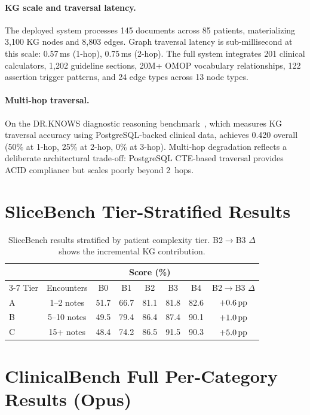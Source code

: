 \paragraph{KG scale and traversal latency.}
The deployed system processes 145 documents across 85 patients, materializing 3{,}100 KG nodes and 8{,}803 edges.
Graph traversal latency is sub-millisecond at this scale: 0.57\,ms (1-hop), 0.75\,ms (2-hop).
The full system integrates 201 clinical calculators, 1{,}202 guideline sections, 20M+ OMOP vocabulary relationships, 122 assertion trigger patterns, and 24 edge types across 13 node types.

\paragraph{Multi-hop traversal.}
\label{app:drknows}
On the DR.KNOWS diagnostic reasoning benchmark~\cite{drknows2025}, which measures KG traversal accuracy using PostgreSQL-backed clinical data, \epikg achieves 0.420 overall (50\% at 1-hop, 25\% at 2-hop, 0\% at 3-hop).
Multi-hop degradation reflects a deliberate architectural trade-off: PostgreSQL CTE-based traversal provides ACID compliance but scales poorly beyond 2~hops.


\section{SliceBench Tier-Stratified Results}
\label{app:slicebench_tiers}

\begin{table}[ht]
\centering
\small
\caption{SliceBench results stratified by patient complexity tier. B2$\rightarrow$B3 $\Delta$ shows the incremental KG contribution.}
\label{tab:slicebench_tiers}
\begin{tabular}{@{}lccccccc@{}}
\toprule
& & \multicolumn{5}{c}{Score (\%)} & \\
\cmidrule(lr){3-7}
Tier & Encounters & B0 & B1 & B2 & B3 & B4 & B2$\rightarrow$B3 $\Delta$ \\
\midrule
A & 1--2 notes & 51.7 & 66.7 & 81.1 & 81.8 & 82.6 & $+0.6\,\text{pp}$ \\
B & 5--10 notes & 49.5 & 79.4 & 86.4 & 87.4 & 90.1 & $+1.0\,\text{pp}$ \\
C & 15+ notes & 48.4 & 74.2 & 86.5 & 91.5 & 90.3 & $+5.0\,\text{pp}$ \\
\bottomrule
\end{tabular}
\end{table}


\section{ClinicalBench Full Per-Category Results (Opus)}
\label{app:percategory}


